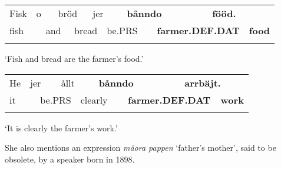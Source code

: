 \begin{tabular}{llllllllllll}
\lsptoprule
Fisk & \multicolumn{2}{l}{o

} & \multicolumn{2}{l}{bröd

} & \multicolumn{2}{l}{jer

} & \multicolumn{2}{l}{{\bfseries bånndo}

} & \multicolumn{2}{l}{{\bfseries fööd.}

} & \\
\multicolumn{2}{l}{fish

} & \multicolumn{2}{l}{and

} & \multicolumn{2}{l}{bread

} & \multicolumn{2}{l}{be.PRS

} & \multicolumn{2}{l}{{\bfseries farmer.DEF.DAT}

} & \multicolumn{2}{l}{{\bfseries food}

}\\
\lspbottomrule
\end{tabular}

\begin{styleTranslation}
‘Fish and bread are the farmer’s food.’

\end{styleTranslation}

\begin{tabular}{llllllllll}
\lsptoprule
He & \multicolumn{2}{l}{jer

} & \multicolumn{2}{l}{ållt

} & \multicolumn{2}{l}{{\bfseries bånndo}

} & \multicolumn{2}{l}{{\bfseries arrbäjt.}

} & \\
\multicolumn{2}{l}{it

} & \multicolumn{2}{l}{be.PRS

} & \multicolumn{2}{l}{clearly

} & \multicolumn{2}{l}{{\bfseries farmer.DEF.DAT}

} & \multicolumn{2}{l}{{\bfseries work}

}\\
\lspbottomrule
\end{tabular}

\begin{styleTranslation}
‘It is clearly the farmer’s work.’

\end{styleTranslation}

\begin{styleBodyTextFirst}
She also mentions an expression \textit{måora pappen} ‘father’s mother’, said to be obsolete, by a speaker born in 1898.

\end{styleBodyTextFirst}

